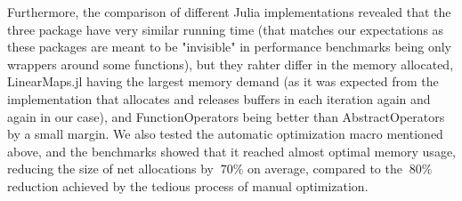 Furthermore, the comparison of different Julia implementations revealed that the three package have very similar running time (that matches our expectations as these packages are meant to be "invisible" in performance benchmarks being only wrappers around some functions), but they rahter differ in the memory allocated, LinearMaps.jl having the largest memory demand (as it was expected from the implementation that allocates and releases buffers in each iteration again and again in our case), and FunctionOperators being better than AbstractOperators by a small margin. We also tested the automatic optimization macro mentioned above, and the benchmarks showed that it reached almost optimal memory usage, reducing the size of net allocations by $~70\%$ on average, compared to the $~80\%$ reduction achieved by the tedious process of manual optimization.

